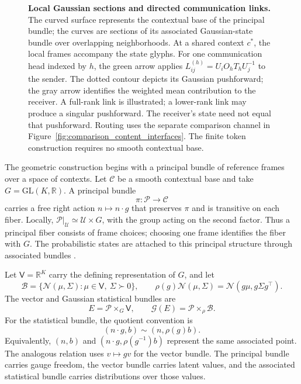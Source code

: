 \documentclass[twoside,11pt]{article}
\begin{document}
\begin{figure}[H]
{\begin{tikzpicture}[ every node/.style={font=\small}]
\end{tikzpicture}
}
\caption{\textbf{Local Gaussian sections and directed communication links.}
The curved surface represents the contextual base of the principal bundle; the curves are sections of its associated Gaussian-state bundle over overlapping neighborhoods. At a shared context \(c^*\), the local frames accompany the state glyphs. For one communication head indexed by \(h\), the green arrow applies \(L_{ij}^{(h)}=U_iO_hT_hU_j^{-1}\) to the sender. The dotted contour depicts its Gaussian pushforward; the gray arrow identifies the weighted mean contribution to the receiver. A full-rank link is illustrated; a lower-rank link may produce a singular pushforward. The receiver's state need not equal that pushforward. Routing uses the separate comparison channel in Figure~\ref{fig:comparison_content_interfaces}. The finite token construction requires no smooth contextual base.}
\label{fig:link_construction}
\end{figure}

The geometric construction begins with a principal bundle of reference frames over a space of contexts. Let \(\mathcal C\) be a smooth contextual base and take \(G=\mathrm{GL}(K,\mathbb R)\). A principal bundle
\begin{equation}
\pi:\mathcal P\longrightarrow\mathcal C
\label{eq:principal_bundle}
\end{equation}
carries a free right action \(n\mapsto n\cdot g\) that preserves \(\pi\) and is transitive on each fiber. Locally, \(\mathcal P|_{\mathcal U}\simeq\mathcal U\times G\), with the group acting on the second factor. Thus a principal fiber consists of frame choices; choosing one frame identifies the fiber with \(G\). The probabilistic states are attached to this principal structure through associated bundles \citep{nakahara2003geometry,frankel2011geometry}.

Let \(\mathsf V=\mathbb R^K\) carry the defining representation of \(G\), and let
\begin{equation}
\mathcal B=\{\mathcal N(\mu,\Sigma):\mu\in\mathsf V,\ \Sigma\succ0\},
\qquad
\rho(g)\mathcal N(\mu,\Sigma)=\mathcal N(g\mu,g\Sigma g^\top).
\label{eq:gaussian_associated_action}
\end{equation}
The vector and Gaussian statistical bundles are
\begin{equation}
E=\mathcal P\times_G\mathsf V,
\qquad
\mathcal G(E)=\mathcal P\times_\rho\mathcal B.
\label{eq:associated_state_bundles}
\end{equation}
For the statistical bundle, the quotient convention is
\begin{equation}
(n\cdot g,b)\sim(n,\rho(g)b).
\label{eq:associated_quotient}
\end{equation}
Equivalently, \((n,b)\) and \((n\cdot g,\rho(g^{-1})b)\) represent the same associated point. The analogous relation uses \(v\mapsto gv\) for the vector bundle. The principal bundle carries gauge freedom, the vector bundle carries latent values, and the associated statistical bundle carries distributions over those values.
\end{document}
